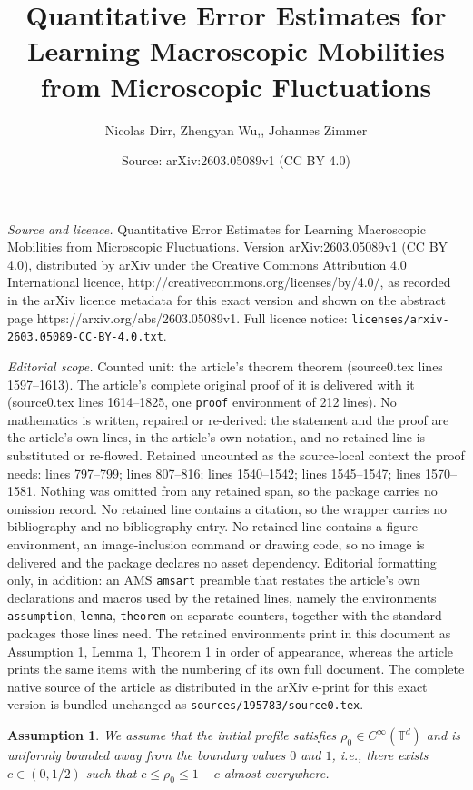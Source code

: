 \documentclass[10pt,a4paper]{amsart}
\title{\LARGE Quantitative Error Estimates for Learning Macroscopic Mobilities from Microscopic Fluctuations}
\author{Nicolas Dirr, Zhengyan Wu,, Johannes Zimmer}
\date{Source: arXiv:2603.05089v1 (CC BY 4.0)}
\newtheorem{assumption}{Assumption}
\def\leq{\leqslant}
\begin{document}
\maketitle

\noindent\emph{Source and licence.} \LARGE Quantitative Error Estimates for Learning Macroscopic Mobilities from Microscopic Fluctuations. Version arXiv:2603.05089v1 (CC BY 4.0), distributed by arXiv under the Creative Commons Attribution 4.0 International licence, http://creativecommons.org/licenses/by/4.0/, as recorded in the arXiv licence metadata for this exact version and shown on the abstract page https://arxiv.org/abs/2603.05089v1. Full licence notice: \texttt{licenses/arxiv-2603.05089-CC-BY-4.0.txt}.\par\smallskip

\noindent\textit{Editorial scope.} Counted unit: the article's theorem theorem (source0.tex lines 1597--1613). The article's complete original proof of it is delivered with it (source0.tex lines 1614--1825, one \texttt{proof} environment of 212 lines). No mathematics is written, repaired or re-derived: the statement and the proof are the article's own lines, in the article's own notation, and no retained line is substituted or re-flowed.  Retained uncounted as the source-local context the proof needs: lines 797--799; lines 807--816; lines 1540--1542; lines 1545--1547; lines 1570--1581.  Nothing was omitted from any retained span, so the package carries no omission record.  No retained line contains a citation, so the wrapper carries no bibliography and no bibliography entry.  No retained line contains a figure environment, an image-inclusion command or drawing code, so no image is delivered and the package declares no asset dependency.  Editorial formatting only, in addition: an AMS \texttt{amsart} preamble that restates the article's own declarations and macros used by the retained lines, namely the environments \texttt{assumption}, \texttt{lemma}, \texttt{theorem} on separate counters, together with the standard packages those lines need.  The retained environments print in this document as Assumption 1, Lemma 1, Theorem 1 in order of appearance, whereas the article prints the same items with the numbering of its own full document.  The complete native source of the article as distributed in the arXiv e-print for this exact version is bundled unchanged as \texttt{sources/195783/source0.tex}.
\begin{assumption}\label{Assump-initial-1}
We assume that the initial profile satisfies $\rho_0 \in C^{\infty}(\mathbb{T}^d)$ and is uniformly bounded away from the boundary values $0$ and $1$, i.e., there exists $c \in (0,1/2)$ such that $c \leq \rho_0 \leq 1 - c$ almost everywhere.
\end{assumption}
\end{document}
